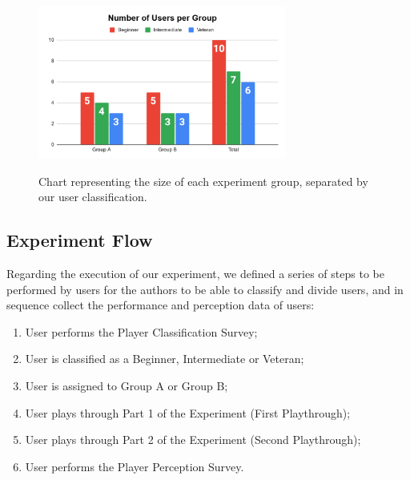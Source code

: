 \begin{figure}[!ht]
    \begin{center}
    \caption{Chart representing the size of each experiment group, separated by our user classification.}
        \includegraphics[width=22em]{figures/fig-user-groups.png}
        \label{fig:user-group-sizes}
    \end{center}
\end{figure}

\subsection{Experiment Flow}


Regarding the execution of our experiment, we defined a series of steps to be performed by users for the authors to be able to classify and divide users, and in sequence collect the performance and perception data of users:

\begin{enumerate}
    \item{User performs the Player Classification Survey;}
    \item{User is classified as a Beginner, Intermediate or Veteran;}
    \item{User is assigned to Group A or Group B;}
    \item{User plays through Part 1 of the Experiment (First Playthrough);}
    \item{User plays through Part 2 of the Experiment (Second Playthrough);}
    \item{User performs the Player Perception Survey.}
\end{enumerate}

